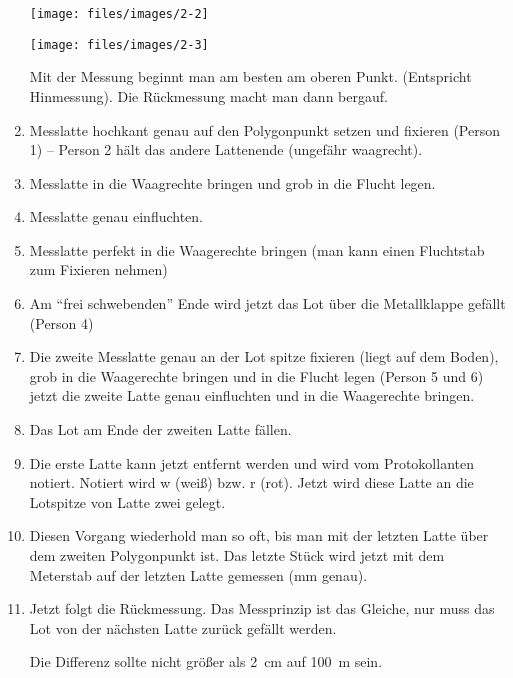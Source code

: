 \begin{list}{}{}
\begin{enumerate}
\begin{center}

	\texttt{[image: files/images/2-2]}

	\texttt{[image: files/images/2-3]}
\end{center}
\vspace{0.5cm}
Mit der Messung beginnt man am besten am oberen Punkt. (Entspricht Hinmessung). Die Rückmessung macht man dann bergauf.
\item Messlatte hochkant genau auf den Polygonpunkt setzen und fixieren (Person 1) -- Person 2 hält das andere Lattenende
(ungefähr waagrecht).
\item Messlatte in die Waagrechte bringen und grob in die Flucht legen.
\item Messlatte genau einfluchten.
\item Messlatte perfekt in die Waagerechte bringen (man kann einen Fluchtstab zum Fixieren nehmen)
\item Am \enquote{frei schwebenden} Ende wird jetzt das Lot über die Metallklappe gefällt (Person 4)
\item Die zweite Messlatte genau an der Lot spitze fixieren (liegt auf dem Boden), grob in die Waagerechte bringen und in
die Flucht legen (Person 5 und 6) jetzt die zweite Latte genau einfluchten und in die Waagerechte bringen.
\item Das Lot am Ende der zweiten Latte fällen.
\item Die erste Latte kann jetzt entfernt werden und wird vom Protokollanten notiert. Notiert wird w (weiß) bzw. r (rot).
Jetzt wird diese Latte an die Lotspitze von Latte zwei gelegt.
\item Diesen Vorgang wiederhold man so oft, bis man mit der letzten Latte über dem zweiten Polygonpunkt ist. Das letzte
Stück wird jetzt mit dem Meterstab auf der letzten Latte gemessen (mm genau).
\item Jetzt folgt die Rückmessung. Das Messprinzip ist das Gleiche, nur muss das Lot von der nächsten Latte zurück gefällt
werden.
Die Differenz sollte nicht größer als \SI{2}{\centi\metre} auf \SI{100}{\metre} sein.
\end{enumerate}
\end{list}

